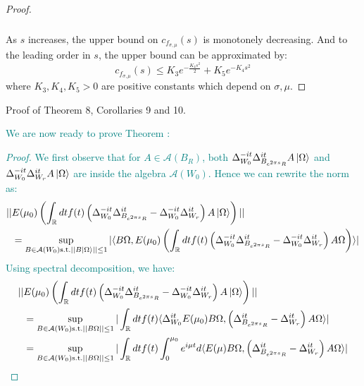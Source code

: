 \documentclass[a4paper,11pt]{article}
\theoremstyle{definition}
\newcommand{\lb}{\left(}
\newcommand{\rb}{\right)}
\newcommand{\YC}[1]{\textcolor{teal}{#1}}
\begin{document}
{\begin{proof}
\begin{align}
\begin{split}
        \end{split}
    \end{align}
    As $s$ increases, the upper bound on $c_{f_{\sigma,\mu}}(s)$ is monotonely decreasing. And to the leading order in $s$, the upper bound can be approximated by:
    \begin{equation}
        c_{f_{\sigma,\mu}}(s) \leq K_3e^{-\frac{K_4 s^2}{2}} + K_5e^{-K_4 s^2}
    \end{equation}
    where $K_3, K_4, K_5 > 0$ are positive constants which depend on $\sigma, \mu$. 
\end{proof}
Proof of Theorem 8, Corollaries 9 and 10.
\YC{
We are now ready to prove Theorem \label{theorem:mainresult}:
\begin{proof}
    We first observe that for $A\in\mathcal{A}(B_R)$, both $\Delta^{-it}_{W_0}\Delta^{it}_{B_{e^{2\pi s}R}}A\ket{\Omega}$ and $\Delta^{-it}_{W_0}\Delta^{it}_{W_r}A\ket{\Omega}$ are inside the algebra $\mathcal{A}(W_0)$. Hence we can rewrite the norm as:
    \begin{align}
        \begin{split}
            ||&E(\mu_0)\lb\int_\mathbb{R} dt f(t)\lb \Delta_{W_0}^{-it}\Delta_{B_{e^{2\pi s}R}}^{it} - \Delta_{W_0}^{-it}\Delta_{W_r}^{it} \rb A\ket{\Omega}\rb|| \\&= \sup_{B\in\mathcal{A}(W_0)\text{s.t.}||B\ket{\Omega}||\leq 1}|\langle  B\Omega, E(\mu_0)\lb\int_\mathbb{R} dt f(t)\lb \Delta^{-it}_{W_0}\Delta^{it}_{B_{e^{2\pi s}R}} - \Delta^{-it}_{W_0}\Delta^{it}_{W_r}\rb A\Omega\rb\rangle|
        \end{split}
    \end{align}
    Using spectral decomposition, we have:
    \begin{align}
        \begin{split}
            ||&E(\mu_0)\lb\int_\mathbb{R} dt f(t)\lb \Delta_{W_0}^{-it}\Delta_{B_{e^{2\pi s}R}}^{it} - \Delta_{W_0}^{-it}\Delta_{W_r}^{it} \rb A\ket{\Omega}\rb||
            \\&
            =\sup_{B\in\mathcal{A}(W_0)\text{s.t.}||B\Omega||\leq 1}|\int_\mathbb{R} dt f(t)\langle \Delta_{W_0}^{it}E(\mu_0)B\Omega, \lb\Delta^{it}_{B_{e^{2\pi s}R}} - \Delta^{it}_{W_r}\rb A\Omega\rangle|
            \\&
            =\sup_{B\in\mathcal{A}(W_0)\text{s.t.}||B\Omega||\leq 1}|\int_\mathbb{R} dt f(t) \int_0^{\mu_0}e^{i\mu t}d\langle E(\mu)B\Omega, \lb\Delta^{it}_{B_{e^{2\pi s}R}} - \Delta^{it}_{W_r}\rb A\Omega\rangle|
        \end{split}

\end{align}
\end{proof}}}
\end{document}
